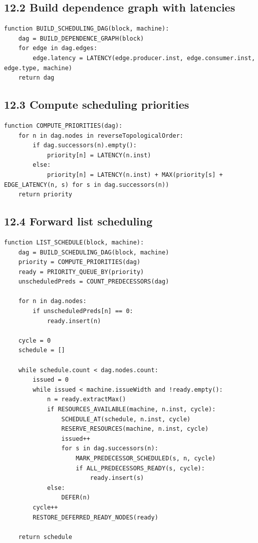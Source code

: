 \documentclass[10pt,letterpaper]{article}
\begin{document}
\subsection*{12.2 Build dependence graph with latencies}

\begin{verbatim}
function BUILD_SCHEDULING_DAG(block, machine):
    dag = BUILD_DEPENDENCE_GRAPH(block)
    for edge in dag.edges:
        edge.latency = LATENCY(edge.producer.inst, edge.consumer.inst, edge.type, machine)
    return dag
\end{verbatim}

\subsection*{12.3 Compute scheduling priorities}

\begin{verbatim}
function COMPUTE_PRIORITIES(dag):
    for n in dag.nodes in reverseTopologicalOrder:
        if dag.successors(n).empty():
            priority[n] = LATENCY(n.inst)
        else:
            priority[n] = LATENCY(n.inst) + MAX(priority[s] + EDGE_LATENCY(n, s) for s in dag.successors(n))
    return priority
\end{verbatim}

\subsection*{12.4 Forward list scheduling}

\begin{verbatim}
function LIST_SCHEDULE(block, machine):
    dag = BUILD_SCHEDULING_DAG(block, machine)
    priority = COMPUTE_PRIORITIES(dag)
    ready = PRIORITY_QUEUE_BY(priority)
    unscheduledPreds = COUNT_PREDECESSORS(dag)

    for n in dag.nodes:
        if unscheduledPreds[n] == 0:
            ready.insert(n)

    cycle = 0
    schedule = []

    while schedule.count < dag.nodes.count:
        issued = 0
        while issued < machine.issueWidth and !ready.empty():
            n = ready.extractMax()
            if RESOURCES_AVAILABLE(machine, n.inst, cycle):
                SCHEDULE_AT(schedule, n.inst, cycle)
                RESERVE_RESOURCES(machine, n.inst, cycle)
                issued++
                for s in dag.successors(n):
                    MARK_PREDECESSOR_SCHEDULED(s, n, cycle)
                    if ALL_PREDECESSORS_READY(s, cycle):
                        ready.insert(s)
            else:
                DEFER(n)
        cycle++
        RESTORE_DEFERRED_READY_NODES(ready)

    return schedule
\end{verbatim}
\end{document}
